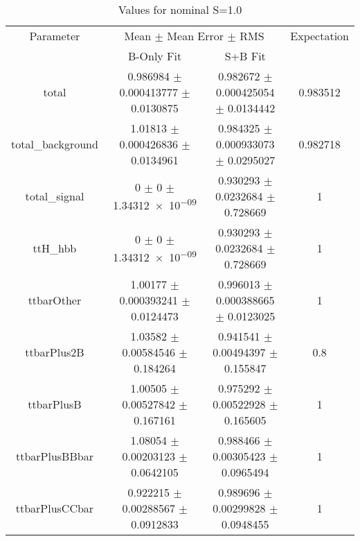 \begin{table}
\centering
\caption{Values for nominal S=1.0}
\begin{tabular}{cccc}
\toprule
Parameter & \multicolumn{2}{c}{Mean $\pm$ Mean Error $\pm$ RMS} & Expectation\\
 & B-Only Fit & S+B Fit & \\
\midrule
total & \num{0.986984} $\pm$ \num{0.000413777} $\pm$ \num{0.0130875} & \num{0.982672} $\pm$ \num{0.000425054} $\pm$ \num{0.0134442} & \num{0.983512}\\
total\_background & \num{1.01813} $\pm$ \num{0.000426836} $\pm$ \num{0.0134961} & \num{0.984325} $\pm$ \num{0.000933073} $\pm$ \num{0.0295027} & \num{0.982718}\\
total\_signal & \num{0} $\pm$ \num{0} $\pm$ \num{1.34312e-09} & \num{0.930293} $\pm$ \num{0.0232684} $\pm$ \num{0.728669} & \num{1}\\
ttH\_hbb & \num{0} $\pm$ \num{0} $\pm$ \num{1.34312e-09} & \num{0.930293} $\pm$ \num{0.0232684} $\pm$ \num{0.728669} & \num{1}\\
ttbarOther & \num{1.00177} $\pm$ \num{0.000393241} $\pm$ \num{0.0124473} & \num{0.996013} $\pm$ \num{0.000388665} $\pm$ \num{0.0123025} & \num{1}\\
ttbarPlus2B & \num{1.03582} $\pm$ \num{0.00584546} $\pm$ \num{0.184264} & \num{0.941541} $\pm$ \num{0.00494397} $\pm$ \num{0.155847} & \num{0.8}\\
ttbarPlusB & \num{1.00505} $\pm$ \num{0.00527842} $\pm$ \num{0.167161} & \num{0.975292} $\pm$ \num{0.00522928} $\pm$ \num{0.165605} & \num{1}\\
ttbarPlusBBbar & \num{1.08054} $\pm$ \num{0.00203123} $\pm$ \num{0.0642105} & \num{0.988466} $\pm$ \num{0.00305423} $\pm$ \num{0.0965494} & \num{1}\\
ttbarPlusCCbar & \num{0.922215} $\pm$ \num{0.00288567} $\pm$ \num{0.0912833} & \num{0.989696} $\pm$ \num{0.00299828} $\pm$ \num{0.0948455} & \num{1}\\
\bottomrule
\end{tabular}
\end{table}